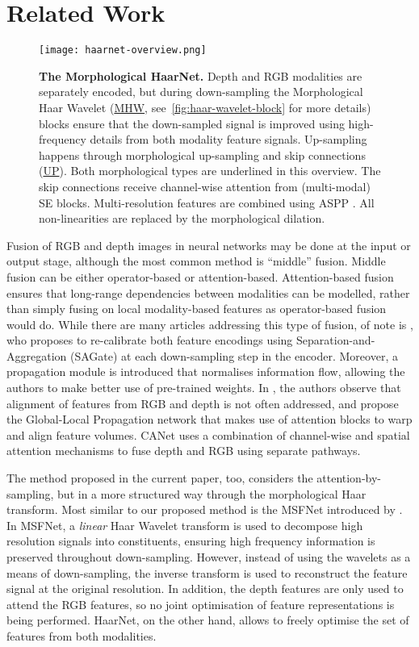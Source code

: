 \documentclass{article}
\begin{document}
\section{Related Work} \label{sec:related-work}
\begin{figure}[t]
\centering
\texttt{[image: haarnet-overview.png]}
\caption{
\textbf{The Morphological HaarNet.}
Depth and RGB modalities are separately encoded, but during down-sampling the Morphological Haar Wavelet (\underline{MHW}, see~\autoref{fig:haar-wavelet-block} for more details) blocks ensure that the down-sampled signal is improved using high-frequency details from both modality feature signals.
Up-sampling happens through morphological up-sampling and skip connections (\underline{UP}).
Both morphological types are underlined in this overview.
The skip connections receive channel-wise attention from (multi-modal) SE \cite{hu2018squeeze} blocks.
Multi-resolution features are combined using ASPP \cite{chen2017deeplab}.
All non-linearities are replaced by the morphological dilation.
}
\label{fig:haarnet-overview}
\end{figure}
Fusion of RGB and depth images in neural networks may be done at the input or output stage, although the most common method is ``middle'' fusion.
Middle fusion can be either operator-based or attention-based. 
Attention-based fusion ensures that long-range dependencies between modalities can be modelled, rather than simply fusing on local modality-based features as operator-based fusion would do.
While there are many articles addressing this type of fusion, of note is \cite{chen2020bi}, who proposes to re-calibrate both feature encodings using Separation-and-Aggregation (SAGate) at each down-sampling step in the encoder. 
Moreover, a propagation module is introduced that normalises information flow, allowing the authors to make better use of pre-trained weights.
In \cite{chen2021global}, the authors observe that alignment of features from RGB and depth is not often addressed, and propose the Global-Local Propagation network that makes use of attention blocks to warp and align feature volumes.
CANet \cite{zhou2022canet} uses a combination of channel-wise and spatial attention mechanisms to fuse depth and RGB using separate pathways.

The method proposed in the current paper, too, considers the attention-by-sampling, but in a more structured way through the morphological Haar transform.
Most similar to our proposed method is the MSFNet introduced by \cite{jiang2022multi}.
In MSFNet, a \emph{linear} Haar Wavelet transform is used to decompose high resolution signals into constituents, ensuring high frequency information is preserved throughout down-sampling. 
However, instead of using the wavelets as a means of down-sampling, the inverse transform is used to reconstruct the feature signal at the original resolution. 
In addition, the depth features are only used to attend the RGB features, so no joint optimisation of feature representations is being performed.
HaarNet, on the other hand, allows to freely optimise the set of features from both modalities.
\end{document}
